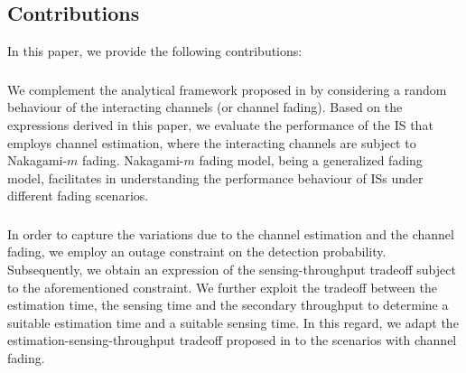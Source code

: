 \subsection{Contributions}
In this paper, we provide the following contributions:
\subsubsection{}
We complement the analytical framework proposed in \cite{Kaushik16} by considering a random behaviour of the interacting channels (or channel fading). Based on the expressions derived in this paper, we evaluate the performance of the IS that employs channel estimation, where the interacting channels are subject to Nakagami-$m$ fading. Nakagami-$m$ fading model, being a generalized fading model, facilitates in understanding the performance behaviour of ISs under different fading scenarios. 

\subsubsection{}
In order to capture the variations due to the channel estimation and the channel fading, we employ an outage constraint on the detection probability. Subsequently, we obtain an expression of the sensing-throughput tradeoff subject to the aforementioned constraint. 
We further exploit the tradeoff between the estimation time, the sensing time and the secondary throughput to determine a suitable estimation time and a suitable sensing time. In this regard, we adapt the estimation-sensing-throughput tradeoff proposed in \cite{Kaushik16} to the scenarios with channel fading. 


